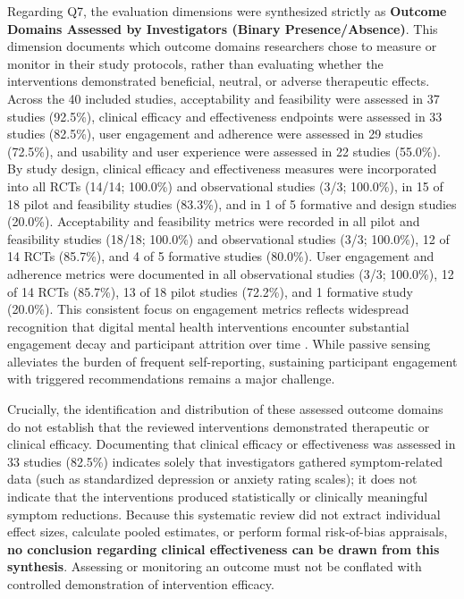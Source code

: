 Regarding Q7, the evaluation dimensions were synthesized strictly as \textbf{Outcome Domains Assessed by Investigators (Binary Presence/Absence)}. This dimension documents which outcome domains researchers chose to measure or monitor in their study protocols, rather than evaluating whether the interventions demonstrated beneficial, neutral, or adverse therapeutic effects. Across the 40 included studies, acceptability and feasibility were assessed in 37 studies (92.5\%), clinical efficacy and effectiveness endpoints were assessed in 33 studies (82.5\%), user engagement and adherence were assessed in 29 studies (72.5\%), and usability and user experience were assessed in 22 studies (55.0\%). By study design, clinical efficacy and effectiveness measures were incorporated into all RCTs (14/14; 100.0\%) and observational studies (3/3; 100.0\%), in 15 of 18 pilot and feasibility studies (83.3\%), and in 1 of 5 formative and design studies (20.0\%). Acceptability and feasibility metrics were recorded in all pilot and feasibility studies (18/18; 100.0\%) and observational studies (3/3; 100.0\%), 12 of 14 RCTs (85.7\%), and 4 of 5 formative studies (80.0\%). User engagement and adherence metrics were documented in all observational studies (3/3; 100.0\%), 12 of 14 RCTs (85.7\%), 13 of 18 pilot studies (72.2\%), and 1 formative study (20.0\%). This consistent focus on engagement metrics reflects widespread recognition that digital mental health interventions encounter substantial engagement decay and participant attrition over time \cite{stone2023evaluation, kraft2024mobile}. While passive sensing alleviates the burden of frequent self-reporting, sustaining participant engagement with triggered recommendations remains a major challenge.

Crucially, the identification and distribution of these assessed outcome domains do not establish that the reviewed interventions demonstrated therapeutic or clinical efficacy. Documenting that clinical efficacy or effectiveness was assessed in 33 studies (82.5\%) indicates solely that investigators gathered symptom-related data (such as standardized depression or anxiety rating scales); it does not indicate that the interventions produced statistically or clinically meaningful symptom reductions. Because this systematic review did not extract individual effect sizes, calculate pooled estimates, or perform formal risk-of-bias appraisals, \textbf{no conclusion regarding clinical effectiveness can be drawn from this synthesis}. Assessing or monitoring an outcome must not be conflated with controlled demonstration of intervention efficacy.

